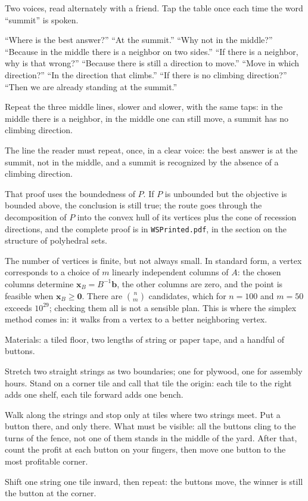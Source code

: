 \begin{bacakeras}
Two voices, read alternately with a friend. Tap the table once each time the word ``summit'' is
spoken.

``Where is the best answer?'' ``At the summit.''
``Why not in the middle?'' ``Because in the middle there is a neighbor on two sides.''
``If there is a neighbor, why is that wrong?'' ``Because there is still a direction to move.''
``Move in which direction?'' ``In the direction that climbs.''
``If there is no climbing direction?'' ``Then we are already standing at the summit.''

Repeat the three middle lines, slower and slower, with the same taps: in the middle there is a
neighbor, in the middle one can still move, a summit has no climbing direction.

The line the reader must repeat, once, in a clear voice: the best answer is at the summit, not
in the middle, and a summit is recognized by the absence of a climbing direction.
\end{bacakeras}

That proof uses the boundedness of $P$. If $P$ is unbounded but the objective is bounded above,
the conclusion is still true; the route goes through the decomposition of $P$ into the convex
hull of its vertices plus the cone of recession directions, and the complete proof is in
\texttt{WSPrinted.pdf}, in the section on the structure of polyhedral sets.

The number of vertices is finite, but not always small. In standard form, a vertex corresponds
to a choice of $m$ linearly independent columns of $A$: the chosen columns determine
$\mathbf{x}_{B}=B^{-1}\mathbf{b}$, the other columns are zero, and the point is feasible when
$\mathbf{x}_{B}\ge\mathbf{0}$. There are $\binom{n}{m}$ candidates, which for $n=100$ and
$m=50$ exceeds $10^{29}$; checking them all is not a sensible plan. This is where the simplex
method comes in: it walks from a vertex to a better neighboring vertex.

\begin{tangan}
Materials: a tiled floor, two lengths of string or paper tape, and a handful of buttons.

Stretch two straight strings as two boundaries; one for plywood, one for assembly hours. Stand
on a corner tile and call that tile the origin: each tile to the right adds one shelf, each
tile forward adds one bench.

Walk along the strings and stop only at tiles where two strings meet. Put a button there, and
only there. What must be visible: all the buttons cling to the turns of the fence, not one of
them stands in the middle of the yard. After that, count the profit at each button on your
fingers, then move one button to the most profitable corner.

Shift one string one tile inward, then repeat: the buttons move, the winner is still the
button at the corner.
\end{tangan}

